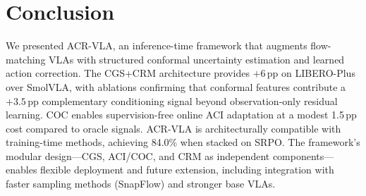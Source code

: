 \documentclass[10pt,twocolumn]{article}
\begin{document}
\section{Conclusion}
\label{sec:conclusion}

We presented ACR-VLA, an inference-time framework that augments flow-matching VLAs with structured conformal uncertainty estimation and learned action correction.
The CGS+CRM architecture provides $+6$\,pp on LIBERO-Plus over SmolVLA, with ablations confirming that conformal features contribute a $+3.5$\,pp complementary conditioning signal beyond observation-only residual learning.
COC enables supervision-free online ACI adaptation at a modest 1.5\,pp cost compared to oracle signals.
ACR-VLA is architecturally compatible with training-time methods, achieving 84.0\% when stacked on SRPO.
The framework's modular design---CGS, ACI/COC, and CRM as independent components---enables flexible deployment and future extension, including integration with faster sampling methods (SnapFlow) and stronger base VLAs.
\end{document}
